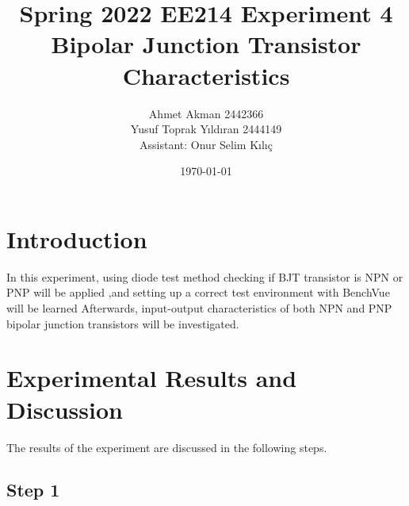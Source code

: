 \documentclass[letterpaper,12pt]{article}
\begin{document}
\thispagestyle{empty}

\title{Spring 2022 EE214 Experiment 4  \protect\\ Bipolar Junction Transistor Characteristics}
\author{Ahmet Akman 2442366 \protect\\ Yusuf Toprak Yıldıran 2444149 \protect\\ Assistant: Onur Selim Kılıç}
\date{\today}
\maketitle
\tableofcontents
\section{Introduction}
In this experiment, using diode test method checking if BJT transistor is NPN or PNP will be applied ,and setting up a correct test environment with BenchVue will be learned Afterwards, input-output characteristics of both NPN and PNP bipolar junction transistors will be investigated.

\section{Experimental Results and Discussion}
The results of the experiment are discussed in the following steps.
%
\subsection{Step 1}
\end{document}
